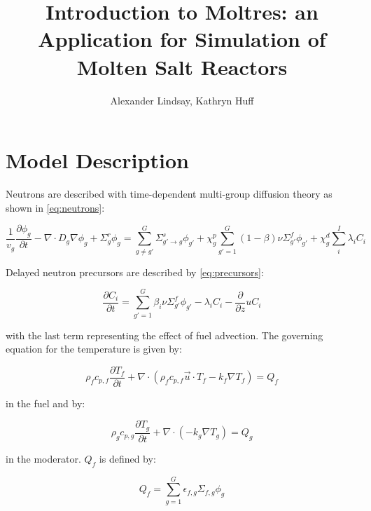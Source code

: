 \documentclass{article}
\title{Introduction to Moltres: an Application for Simulation of Molten Salt Reactors}
\author{Alexander Lindsay, Kathryn Huff}
\let\Oldsection\section
\renewcommand{\section}{\FloatBarrier\Oldsection}
\begin{document}
\maketitle

\section{Model Description}

Neutrons are described with time-dependent multi-group diffusion theory as shown
in \cref{eq:neutrons}:

\begin{equation}
\frac{1}{v_g}\frac{\partial \phi_g}{\partial t} - \nabla \cdot D_g \nabla \phi_g
+ \Sigma_g^r \phi_g = \sum_{g \ne g'}^G \Sigma_{g'\rightarrow g}^s \phi_{g'} + \chi_g^p \sum_{g' = 1}^G (1 - \beta)
\nu \Sigma_{g'}^f \phi_{g'} + \chi_g^d \sum_i^I \lambda_i C_i
\label{eq:neutrons}
\end{equation}

Delayed neutron precursors are described by \cref{eq:precursors}:

\begin{equation}
\frac{\partial C_i}{\partial t} = \sum_{g'= 1}^G \beta_i \nu \Sigma_{g'}^f
\phi_{g'} - \lambda_i C_i - \frac{\partial}{\partial z} u C_i
\label{eq:precursors}
\end{equation}

with the last term representing the effect of fuel advection. The governing
equation for the temperature is given by:

\begin{equation}
  \rho_fc_{p,f}\frac{\partial T_f}{\partial t} + \nabla\cdot\left(\rho_f c_{p,f}
  \vec{u}\cdot T_f -k_f\nabla T_f\right) =  Q_f
  \label{eq:fuel_temp}
\end{equation}

in the fuel and by:

\begin{equation}
  \rho_gc_{p,g}\frac{\partial T_g}{\partial t} + \nabla\cdot\left(-k_g\nabla T_g\right) =  Q_g
  \label{eq:moderator_temp}
\end{equation}

in the moderator. $Q_f$ is defined by:

\begin{equation}
  Q_f = \sum_{g=1}^G \epsilon_{f,g}\Sigma_{f,g}\phi_g
  \label{eq:fuel_source}
\end{equation}
\end{document}
